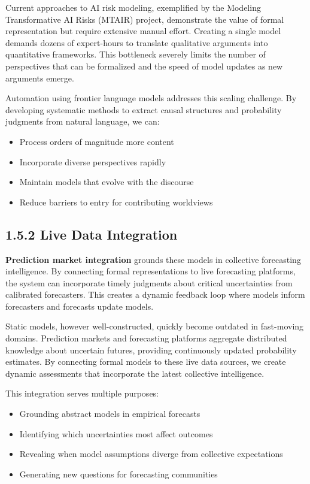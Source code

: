 \documentclass[
  11pt,
  letterpaper,
]{book}
\providecommand{\tightlist}{%
  \setlength{\itemsep}{0pt}\setlength{\parskip}{0pt}}
\begin{document}
Current approaches to AI risk modeling, exemplified by the Modeling
Transformative AI Risks (MTAIR) project, demonstrate the value of formal
representation but require extensive manual effort. Creating a single
model demands dozens of expert-hours to translate qualitative arguments
into quantitative frameworks. This bottleneck severely limits the number
of perspectives that can be formalized and the speed of model updates as
new arguments emerge.

Automation using frontier language models addresses this scaling
challenge. By developing systematic methods to extract causal structures
and probability judgments from natural language, we can:

\begin{itemize}
\tightlist
\item
  Process orders of magnitude more content
\item
  Incorporate diverse perspectives rapidly
\item
  Maintain models that evolve with the discourse
\item
  Reduce barriers to entry for contributing worldviews
\end{itemize}

\subsection*{1.5.2 Live Data Integration}\label{sec-live-data}

\textbf{Prediction market integration} grounds these models in
collective forecasting intelligence. By connecting formal
representations to live forecasting platforms, the system can
incorporate timely judgments about critical uncertainties from
calibrated forecasters. This creates a dynamic feedback loop where
models inform forecasters and forecasts update models.

Static models, however well-constructed, quickly become outdated in
fast-moving domains. Prediction markets and forecasting platforms
aggregate distributed knowledge about uncertain futures, providing
continuously updated probability estimates. By connecting formal models
to these live data sources, we create dynamic assessments that
incorporate the latest collective intelligence.

This integration serves multiple purposes:

\begin{itemize}
\tightlist
\item
  Grounding abstract models in empirical forecasts
\item
  Identifying which uncertainties most affect outcomes
\item
  Revealing when model assumptions diverge from collective expectations
\item
  Generating new questions for forecasting communities
\end{itemize}
\end{document}
